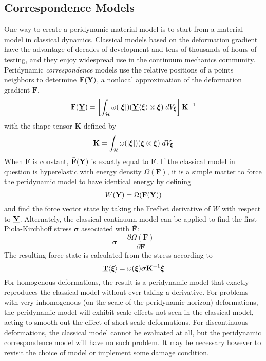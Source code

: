 \subsection{Correspondence Models}
One way to create a peridynamic material model is to start from a material model in classical dynamics.
Classical models based on the deformation gradient have the advantage of decades of development and tens of thousands of hours of testing, and they enjoy widespread use in the continuum mechanics community.
Peridynamic \textit{correspondence} models use the relative positions of a points neighbors to determine $\bar{\mathbf{F}}(\vstate{Y}{}{})$, a nonlocal approximation of the deformation gradient $\mathbf{F}$.
%
\begin{equation}
\label{eq:PDapproxGradient}
\bar{\mathbf{F}}(\vstate{Y}{}{}) = \left[\int_\mathcal{H} \omega(|\boldsymbol{\xi}|)(\vstate{Y}{}{\boldsymbol{\xi}}\otimes \boldsymbol{\xi})\;dV_{\boldsymbol{\xi}} \right]\bar{\mathbf{K}}^{-1}
\end{equation}
with the shape tensor $\mathbf{K}$ defined by
\begin{equation}
\bar{\mathbf{K}} = \int_\mathcal{H}\omega(|\boldsymbol{\xi}|)(\boldsymbol{\xi} \otimes \boldsymbol{\xi})\;dV_{\boldsymbol{\xi}} \notag
\end{equation}
%
When $\mathbf{F}$ is constant, $\bar{\mathbf{F}}(\vstate{Y}{}{})$ is exactly equal to $\mathbf{F}$.
If the classical model in question is hyperelastic with energy density $\Omega(\mathbf{F})$, it is a simple matter to force the peridynamic model to have identical energy by defining
\begin{equation}
W(\vstate{Y}{}{}) = \Omega(\bar{\mathbf{F}}(\vstate{Y}{}{}))
\end{equation}
and find the force vector state by taking the Fre\'chet derivative of $W$ with respect to $\vstate{Y}{}{}$.
Alternately, the classical continuum model can be applied to find the first Piola-Kirchhoff stress $\boldsymbol{\sigma}$ associated with $\bar{\mathbf{F}}$:
\begin{equation}
\boldsymbol{\sigma}=\frac{\partial\Omega(\mathbf{F})}{\partial\mathbf{F}}
\end{equation}
The resulting force state is calculated from the stress according to
\begin{equation}
\vstate{T}{}{\boldsymbol{\xi}} = \omega(\boldsymbol{\xi})\boldsymbol{\sigma}\mathbf{K}^{-1}\boldsymbol{\xi}
\end{equation}
For homogenous deformations, the result is a peridynamic model that exactly reproduces the classical model without ever taking a derivative.
For problems with very inhomogenous (on the scale of the peridynamic horizon) deformations, the peridynamic model will exhibit scale effects not seen in the classical model, acting to smooth out the effect of short-scale deformations.
For discontinuous deformations, the classical model cannot be evaluated at all, but the peridynamic correspondence model will have no such problem.
It may be necessary however to revisit the choice of model or implement some damage condition.
